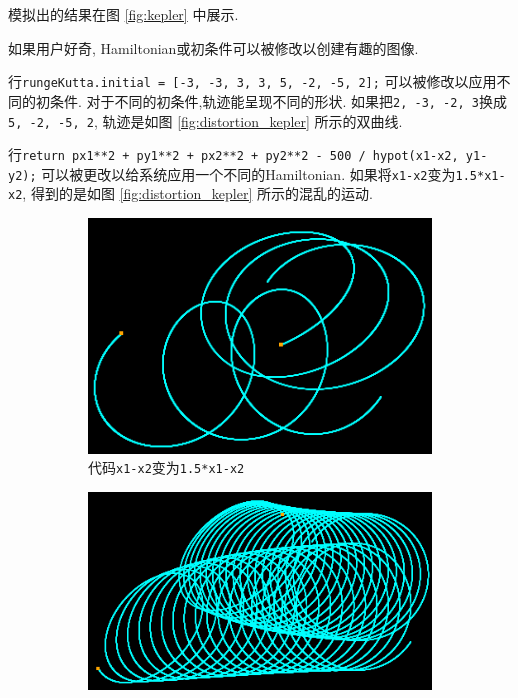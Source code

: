 \documentclass[12pt]{article}
\begin{document}
模拟出的结果在图 \ref{fig:kepler} 中展示.

如果用户好奇, Hamiltonian或初条件可以被修改以创建有趣的图像.

行\texttt{rungeKutta.initial = [-3, -3, 3, 3, 5, -2, -5, 2];}
可以被修改以应用不同的初条件.
对于不同的初条件,轨迹能呈现不同的形状.
如果把\texttt{2, -3, -2, 3}换成\texttt{5, -2, -5, 2},
轨迹是如图 \ref{fig:distortion_kepler} 所示的双曲线.

行\texttt{return px1**2 + py1**2 + px2**2 + py2**2 - 500 / hypot(x1-x2, y1-y2);}
可以被更改以给系统应用一个不同的Hamiltonian.
如果将\texttt{x1-x2}变为\texttt{1.5*x1-x2},
得到的是如图 \ref{fig:distortion_kepler} 所示的混乱的运动.

\begin{figure}[h]
  \centering
  \begin{subfigure}[b]{0.4\linewidth}
    \includegraphics[width=\linewidth]{distortion_kepler.png}
    \caption{代码\texttt{x1-x2}变为\texttt{1.5*x1-x2}}
  \end{subfigure}
  \begin{subfigure}[b]{0.4\linewidth}
    \includegraphics[width=\linewidth]{distortion2_kepler.png}

\end{subfigure}
\end{figure}
\end{document}
